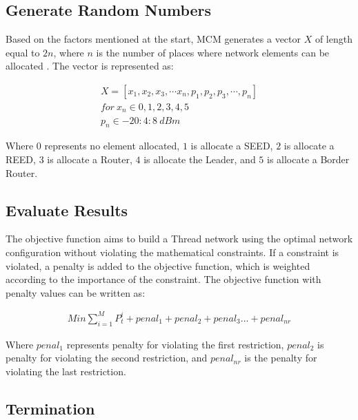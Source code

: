 \subsection{Generate Random Numbers}

Based on the factors mentioned at the start, MCM generates a vector $X$ of length equal to $2n$, where $n$ is the number of places where network elements can be allocated \cite{1576539}. The vector is represented as:

\begin{equation}\label{eq:vector_x}
    \begin{split}
        X=\left[x_1,x_2,x_3,\cdots x_n,p_1,p_2,p_3,\cdots,p_n\right] \\
        for{\ x}_n\in0,1,2,3,4,5 \\
        p_n\in-20:4:8\ dBm
    \end{split}
\end{equation}

    Where $0$ represents no element allocated, $1$ is allocate a SEED, $2$ is allocate a REED, $3$ is allocate a Router, $4$ is allocate the Leader, and $5$ is allocate a Border Router.
\vspace{2mm}

\subsection{Evaluate Results}

The objective function aims to build a Thread network using the optimal network configuration without violating the mathematical constraints. If a constraint is violated, a penalty is added to the objective function, which is weighted according to the importance of the constraint. The objective function with penalty values can be written as:

\begin{equation}\label{eq:objective_function}
    \begin{aligned}
        Min\sum_{i=1}^{M}P_t^i+penal_1+penal_2+penal_3\ldots+penal_{nr}
    \end{aligned}
\end{equation}

    Where $penal_1$ represents penalty for violating the first restriction, $penal_2$ is penalty for violating the second restriction, and $penal_{nr}$ is the penalty for violating the last restriction.
\vspace{2mm}

\subsection{Termination}

